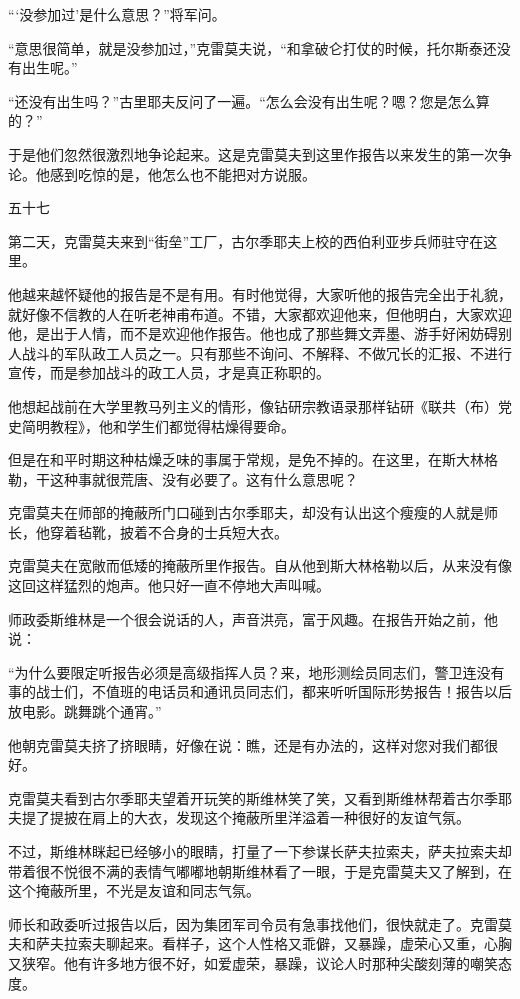 “‘没参加过’是什么意思？”将军问。

“意思很简单，就是没参加过，”克雷莫夫说，“和拿破仑打仗的时候，托尔斯泰还没有出生呢。”

“还没有出生吗？”古里耶夫反问了一遍。“怎么会没有出生呢？嗯？您是怎么算的？”

于是他们忽然很激烈地争论起来。这是克雷莫夫到这里作报告以来发生的第一次争论。他感到吃惊的是，他怎么也不能把对方说服。

五十七

第二天，克雷莫夫来到“街垒”工厂，古尔季耶夫上校的西伯利亚步兵师驻守在这里。

他越来越怀疑他的报告是不是有用。有时他觉得，大家听他的报告完全出于礼貌，就好像不信教的人在听老神甫布道。不错，大家都欢迎他来，但他明白，大家欢迎他，是出于人情，而不是欢迎他作报告。他也成了那些舞文弄墨、游手好闲妨碍别人战斗的军队政工人员之一。只有那些不询问、不解释、不做冗长的汇报、不进行宣传，而是参加战斗的政工人员，才是真正称职的。

他想起战前在大学里教马列主义的情形，像钻研宗教语录那样钻研《联共（布）党史简明教程》，他和学生们都觉得枯燥得要命。

但是在和平时期这种枯燥乏味的事属于常规，是免不掉的。在这里，在斯大林格勒，干这种事就很荒唐、没有必要了。这有什么意思呢？

克雷莫夫在师部的掩蔽所门口碰到古尔季耶夫，却没有认出这个瘦瘦的人就是师长，他穿着毡靴，披着不合身的士兵短大衣。

克雷莫夫在宽敞而低矮的掩蔽所里作报告。自从他到斯大林格勒以后，从来没有像这回这样猛烈的炮声。他只好一直不停地大声叫喊。

师政委斯维林是一个很会说话的人，声音洪亮，富于风趣。在报告开始之前，他说：

“为什么要限定听报告必须是高级指挥人员？来，地形测绘员同志们，警卫连没有事的战士们，不值班的电话员和通讯员同志们，都来听听国际形势报告！报告以后放电影。跳舞跳个通宵。”

他朝克雷莫夫挤了挤眼睛，好像在说：瞧，还是有办法的，这样对您对我们都很好。

克雷莫夫看到古尔季耶夫望着开玩笑的斯维林笑了笑，又看到斯维林帮着古尔季耶夫提了提披在肩上的大衣，发现这个掩蔽所里洋溢着一种很好的友谊气氛。

不过，斯维林眯起已经够小的眼睛，打量了一下参谋长萨夫拉索夫，萨夫拉索夫却带着很不悦很不满的表情气嘟嘟地朝斯维林看了一眼，于是克雷莫夫又了解到，在这个掩蔽所里，不光是友谊和同志气氛。

师长和政委听过报告以后，因为集团军司令员有急事找他们，很快就走了。克雷莫夫和萨夫拉索夫聊起来。看样子，这个人性格又乖僻，又暴躁，虚荣心又重，心胸又狭窄。他有许多地方很不好，如爱虚荣，暴躁，议论人时那种尖酸刻薄的嘲笑态度。

